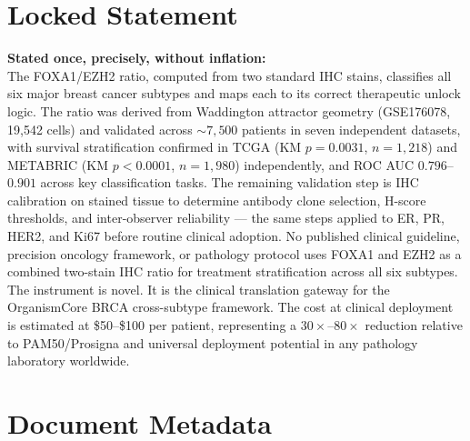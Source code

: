 \documentclass[12pt, a4paper]{article}
\begin{document}
\section{Locked Statement}

\begin{center}
\colorbox{findingbox}{
\begin{minipage}{0.88\textwidth}
\vspace{0.6em}
\textbf{Stated once, precisely, without
inflation:}\\[0.5em]
The FOXA1/EZH2 ratio, computed from two standard
IHC stains, classifies all six major breast cancer
subtypes and maps each to its correct therapeutic
unlock logic. The ratio was derived from
Waddington attractor geometry (GSE176078,
19,542 cells) and validated across ${\sim}7{,}500$
patients in seven independent datasets, with
survival stratification confirmed in TCGA
(KM $p=0.0031$, $n=1{,}218$) and METABRIC
(KM $p<0.0001$, $n=1{,}980$) independently,
and ROC AUC $0.796$--$0.901$ across key
classification tasks. The remaining validation
step is IHC calibration on stained tissue to
determine antibody clone selection, H-score
thresholds, and inter-observer reliability ---
the same steps applied to ER, PR, HER2, and
Ki67 before routine clinical adoption. No
published clinical guideline, precision oncology
framework, or pathology protocol uses FOXA1
and EZH2 as a combined two-stain IHC ratio
for treatment stratification across all six
subtypes. The instrument is novel. It is the
clinical translation gateway for the
OrganismCore BRCA cross-subtype framework.
The cost at clinical deployment is estimated
at \$50--\$100 per patient, representing a
$30\times$--$80\times$ reduction relative
to PAM50/Prosigna and universal deployment
potential in any pathology laboratory worldwide.
\vspace{0.5em}
\end{minipage}}
\end{center}

\section{Document Metadata}
\end{document}
